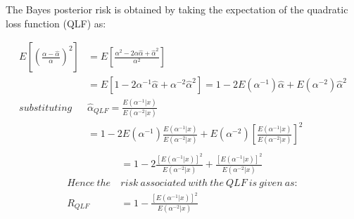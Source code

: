 \documentclass[a4paper,12pt]{report}
\begin{document}
\noindent The Bayes posterior risk is obtained by taking the expectation of the quadratic loss function (QLF) as:

\[\begin{split}
E\left[\left(\frac{\alpha-\hat{\alpha}}{\alpha}\right)^2\right]&=E\left[\frac{\alpha^2-2\alpha\hat{\alpha}+\hat{\alpha}^2}{\alpha^2}\right]\\
&=E\left[1-2\alpha^{-1}\hat{\alpha}+\alpha^{-2}\hat{\alpha}^2\right]=1-2E(\alpha^{-1})\hat{\alpha}+E(\alpha^{-2})\hat{\alpha}^2\\
substituting\ &\hat{\alpha}_{QLF} = \frac{E(\alpha^{-1}|x)}{E(\alpha^{-2}|x)}\\
&=1-2E(\alpha^{-1})\frac{E(\alpha^{-1}|x)}{E(\alpha^{-2}|x)}+E(\alpha^{-2})\left[\frac{E(\alpha^{-1}|x)}{E(\alpha^{-2}|x)}\right]^2\\
\end{split}\]
\begin{equation}\label{prf3}
\begin{split}
&=1-2\frac{[E(\alpha^{-1}|x)]^2}{E(\alpha^{-2}|x)}+\frac{[E(\alpha^{-1}|x)]^2}{E(\alpha^{-2}|x)}\\
Hence\ the\ &risk\ associated\ with\ the\ QLF\ is\ given\ as:\\
R_{QLF} &= 1-\frac{[E(\alpha^{-1}|x)]^2}{E(\alpha^{-2}|x)}
\end{split}
\end{equation}
\end{document}
